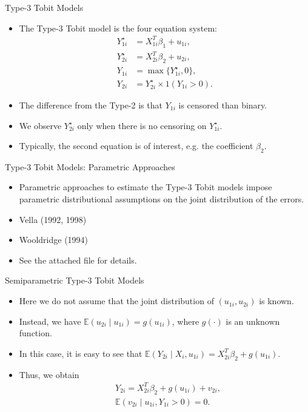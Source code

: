 \documentclass[xcolor=svgnames,dvipdfmx,cjk]{beamer}
\theoremstyle{example}
\def\E{\mathbb{E}}
\begin{document}
\begin{frame}{Type-3 Tobit Models}
      \begin{itemize}
            \item The Type-3 Tobit model is the four equation system:
                  \begin{align*}
                        Y_{1i}^{\star} &= X_{1i}^T \beta_1 + u_{1i},\\
                        Y_{2i}^{\star} &= X_{2i}^T \beta_2 + u_{2i},\\
                        Y_{1i}         &= \max\{ Y_{1i}^{\star}, 0 \},\\
                        Y_{2i}         &= Y_{2i}^{\star} \times 1(Y_{1i} > 0).
                  \end{align*}
            \item The difference from the Type-2 is that \alert{$Y_{1i}$ is censored} than binary. 
            \item We observe $Y_{2i}^{\star}$ only when there is no censoring on $Y_{1i}^{\star}$.
            \item Typically, the second equation is of interest, e.g. the coefficient $\beta_2$. 
      \end{itemize}
\end{frame}

\begin{frame}{Type-3 Tobit Models: Parametric Approaches}
      \begin{itemize}
            \item Parametric approaches to estimate the Type-3 Tobit models impose 
                  parametric distributional assumptions on the joint distribution of the errors.
            \item Vella (1992, 1998)
            \item Wooldridge (1994)
            \item See the attached file for details.
      \end{itemize}
\end{frame}

\begin{frame}{Semiparametric Type-3 Tobit Models}
      \begin{itemize}
            \item Here we do not assume that the joint distribution of $(u_{1i}, u_{2i})$ is known.
            \item Instead, we have
                  $\E(u_{2i} \mid u_{1i}) = g(u_{1i})$,
                  where $g(\cdot)$ is an unknown function.
            \item In this case, it is easy to see that 
                  $\E(Y_{2i} \mid X_i, u_{1i}) = X_{2i}^T \beta_2 + g(u_{1i})$.
            \item Thus, we obtain 
                  \begin{align*}
                        &Y_{2i} = X_{2i}^T \beta_2 + g(u_{1i}) + v_{2i},\\
                        &\E(v_{2i} \mid u_{1i}, Y_{1i} > 0) = 0.
                  \end{align*}
      \end{itemize}
\end{frame}
\end{document}

